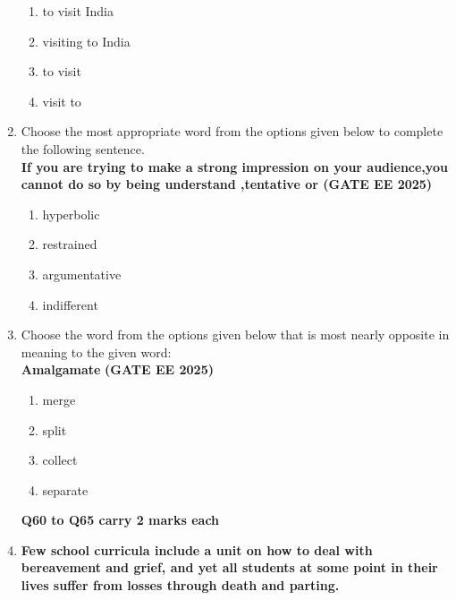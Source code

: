 \documentclass[journal,12pt,onecolumn]{IEEEtran}
\theoremstyle{remark}
\begin{document}
\begin{enumerate}
\begin{enumerate}
    \item to visit India
    \item visiting to India
    \item to visit
    \item visit to
\end{enumerate}
\item Choose the most appropriate word from the options given below to complete the following sentence.\\
\textbf{If you are trying to make a strong impression on your audience,you cannot do so by being understand ,tentative or \underline{\makebox[2cm]{\hfill}} } \hfill \textbf{(GATE EE 2025)}
\begin{enumerate}
    \item hyperbolic
    \item restrained
    \item argumentative
    \item indifferent
\end{enumerate}
\item Choose the word from the options given below that is most nearly opposite in meaning to the given word: \\
\textbf{Amalgamate} \hfill \textbf{(GATE EE 2025)}
\begin{enumerate}
    \item merge
    \item split
    \item collect
    \item separate
\end{enumerate}
\textbf{Q60 to Q65 carry 2 marks each}
\item  \textbf{Few school curricula include a unit on how to deal with bereavement and grief, and yet all students at some point in their lives suffer from losses through death and parting.} 


\end{enumerate}
\end{document}
